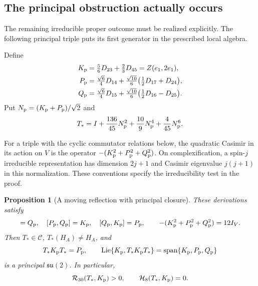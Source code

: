 \documentclass[11pt,a4paper]{article}
\newtheorem{proposition}[proposition]{Proposition}
\newcommand{\Lie}{\operatorname{Lie}}
\newcommand{\Span}{\operatorname{span}}
\begin{document}
\subsection{The principal obstruction actually occurs}

The remaining irreducible proper outcome must be realized explicitly.  The following principal triple puts its first generator in the prescribed local algebra.

Define
\begin{align*}
K_{\rm p}&=\tfrac56D_{23}+\tfrac23D_{45}=Z(e_1,2e_1),\\
P_{\rm p}&=\tfrac{\sqrt6}{4}D_{14}
 +\tfrac{\sqrt{10}}6\bigl(\tfrac12D_{17}+D_{24}\bigr),\\
Q_{\rm p}&=\tfrac{\sqrt6}{4}D_{15}
 +\tfrac{\sqrt{10}}6\bigl(\tfrac12D_{16}-D_{25}\bigr).
\end{align*}
Put $N_{\rm p}=(K_{\rm p}+P_{\rm p})/\sqrt2$ and
\begin{equation}
T_*=I+\frac{136}{45}N_{\rm p}^2+\frac{10}{9}N_{\rm p}^4+\frac4{45}N_{\rm p}^6.
\label{eq:principal-reflection}
\end{equation}

For a triple with the cyclic commutator relations below, the quadratic Casimir in its action on $V$ is the operator $-(K_{\rm p}^2+P_{\rm p}^2+Q_{\rm p}^2)$.  On complexification, a spin-$j$ irreducible representation has dimension $2j+1$ and Casimir eigenvalue $j(j+1)$ in this normalization.  These conventions specify the irreducibility test in the proof.

\begin{proposition}[A moving reflection with principal closure]
\label{prop:principal-moving}
These derivations satisfy
\begin{equation}
[K_{\rm p},P_{\rm p}]=Q_{\rm p},\quad [P_{\rm p},Q_{\rm p}]=K_{\rm p},\quad [Q_{\rm p},K_{\rm p}]=P_{\rm p},
\qquad -(K_{\rm p}^2+P_{\rm p}^2+Q_{\rm p}^2)=12I_V.
\label{eq:principal-triple}
\end{equation}
Then $T_*\in\mathscr C$, $T_*(H_A)\ne H_A$, and
\[
T_*K_{\rm p}T_*=P_{\rm p},\qquad
\Lie\{K_{\rm p},T_*K_{\rm p}T_*\}=\Span\{K_{\rm p},P_{\rm p},Q_{\rm p}\}
\]
is a principal $\mathfrak{su}(2)$.  In particular,
\[
\mathcal R_{30}(T_*,K_{\rm p})>0,\qquad \mathcal H_8(T_*,K_{\rm p})=0.
\]
\end{proposition}
\end{document}
